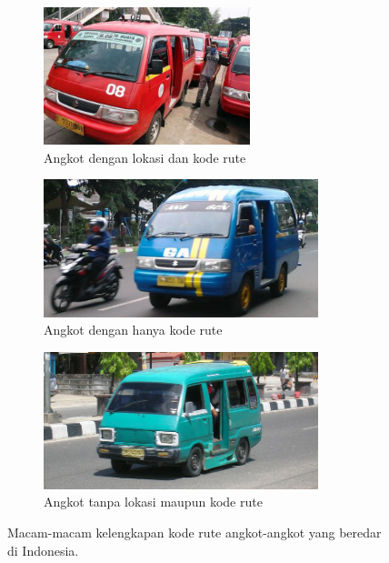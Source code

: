 \documentclass[a4paper,twoside]{article}
\begin{document}
\begin{figure}[h]
     \centering
     \begin{subfigure}[b]{0.4\textwidth}
         \centering
         \includegraphics[height=4cm]{angkot-lokasi}
         \caption{Angkot dengan lokasi dan kode rute}
         \vspace{0.5cm}
         \label{fig:angkot-lokasi}
     \end{subfigure}
     \hfill
     \begin{subfigure}[b]{0.5\textwidth}
         \centering
         \includegraphics[height=4cm]{angkot-kode}
         \caption{Angkot dengan hanya kode rute}
         \vspace{0.5cm}
         \label{fig:angkot-kode}
     \end{subfigure}
     \begin{subfigure}[b]{\textwidth}
         \centering
         \includegraphics[height=4cm]{angkot-tanpakode}
         \caption{Angkot tanpa lokasi maupun kode rute}
         \label{fig:angkot-tanpakode}
     \end{subfigure}
     \caption[Kelengkapan angkot-angkot yang beredar di Indonesia]{Macam-macam kelengkapan kode rute angkot-angkot yang beredar di Indonesia.}
\end{figure}
\end{document}
